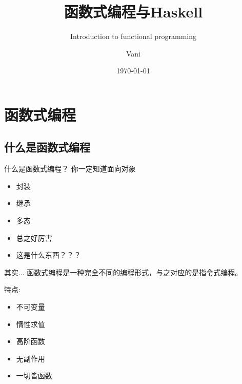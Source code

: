 \documentclass[xcolor=dvipsnames, 11pt]{beamer}
\title{函数式编程与Haskell}
\subtitle{Introduction to functional programming}
\author{Vani}
\institute{Peking University}
\date{\today}
\begin{document}
\section{函数式编程}

\begin{frame}
	\titlepage
\end{frame}

\subsection{什么是函数式编程}

\begin{frame}[fragile]{什么是函数式编程？}
	你一定知道面向对象
	\begin{itemize}
	\vspace{0.1cm}
		\item<2-> 封装
	\vspace{0.1cm}
		\item<3-> 继承
	\vspace{0.1cm}
		\item<4-> 多态
	\vspace{0.1cm}
		\item<5-> 总之好厉害
	\end{itemize}
	\vspace{0.3cm}
	\vspace{0.1cm}
	\begin{itemize}
		\item<7-> 这是什么东西？？？
	\end{itemize}
\end{frame}

\begin{frame}[fragile]{其实...}
	函数式编程是一种完全不同的编程形式，与之对应的是指令式编程。

	\vspace{0.1cm}
	特点:
	\vspace{0.1cm}
	\begin{itemize}
		\item<2-> 不可变量
			\vspace{0.1cm}
		\item<3-> 惰性求值
			\vspace{0.1cm}
		\item<4-> 高阶函数
			\vspace{0.1cm}
		\item<5-> 无副作用
			\vspace{0.1cm}
		\item<6-> 一切皆函数
	\end{itemize}
\end{frame}
\end{document}
